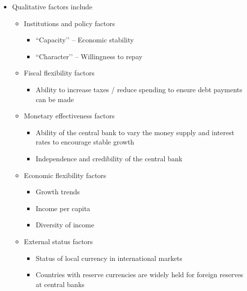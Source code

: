 \documentclass[../notes_compiled.tex]{subfiles}
\begin{document}
\begin{itemize}
\item Qualitative factors include
\begin{itemize}
\item Institutions and policy factors
\begin{itemize}
\item ``Capacity’’ -- Economic stability
\item ``Character’’ -- Willingness to repay
\end{itemize}
\item Fiscal flexibility factors
\begin{itemize}
\item Ability to increase taxes / reduce spending to ensure debt payments can be made
\end{itemize}
\item Monetary effectiveness factors
\begin{itemize}
\item Ability of the central bank to vary the money supply and interest rates to encourage stable growth
\item Independence and credibility of the central bank
\end{itemize}
\item Economic flexibility factors
\begin{itemize}
\item Growth trends
\item Income per capita
\item Diversity of income
\end{itemize}
\item External status factors
\begin{itemize}
\item Status of local currency in international markets
\item Countries with reserve currencies are widely held for foreign reserves at central banks
\end{itemize}
\end{itemize}


\end{itemize}
\end{document}

